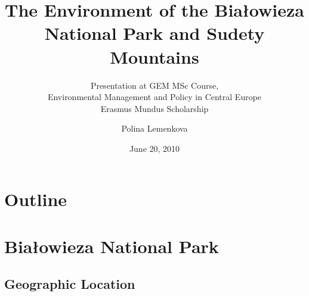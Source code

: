 \documentclass[pdflatex,compress,8pt,
	xcolor={dvipsnames,dvipsnames,svgnames,x11names,table},
	hyperref={colorlinks = true,
	breaklinks = true, urlcolor = NavyBlue, breaklinks = true}]{beamer}
\title[The Environment of the Białowieza National Park and Sudety Mountains]{The Environment of the Białowieza National Park and Sudety Mountains}
\subtitle{Presentation at GEM MSc Course, \\
Environmental Management and Policy in Central Europe\\
Erasmus Mundus Scholarship}
\institute{University of Warsaw}
\author{Polina Lemenkova}
\date{June 20, 2010}
\begin{document}
\begin{frame}
           \titlepage
\end{frame}

\section*{Outline}
\begin{frame}
\vspace{5em}
           \tableofcontents
\end{frame}
         
\section{Białowieza National Park}
\subsection{Geographic Location}
\end{document}
